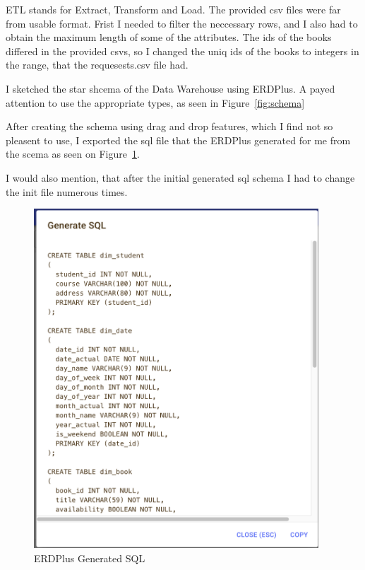 \documentclass[12pt]{report}
\begin{document}
ETL stands for Extract, Transform and Load. The provided csv files were far from usable format. Frist I needed to filter the neccessary rows, and I also had to obtain the maximum length of some of the attributes.
The ids of the books differed in the provided csvs, so I changed the uniq ids of the books to integers in the range, that the requesests.csv file had.

I sketched the star shcema of the Data Warehouse using ERDPlus. A payed attention to use the appropriate types, as seen in Figure~\ref{fig:schema} 

After creating the schema using drag and drop features, which I find not so pleasent to use, I exported the sql file that the ERDPlus generated for me from the scema as seen on Figure~\ref{fig:erd_sql}.

I would also mention, that after the initial generated sql schema I had to change the init file numerous times.

\begin{figure}
    \begin{center}
        \includegraphics[width=0.95\textwidth]{figures/erd_sql.png}
    \end{center}
    \caption{ERDPlus Generated SQL}\label{fig:erd_sql}
\end{figure}
\end{document}
